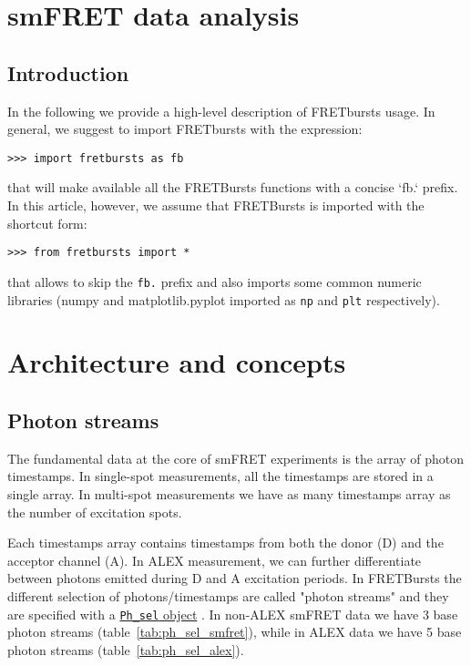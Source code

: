 \section{smFRET data analysis}

\subsection{Introduction}

In the following we provide a high-level description of FRETbursts usage. In general, we suggest to import FRETbursts with the expression:

\begin{verbatim}
>>> import fretbursts as fb
\end{verbatim}

that will make available all the FRETBursts functions with a concise `fb.` prefix. In this article, however, we assume that FRETBursts is imported with the shortcut form:

\begin{verbatim}
>>> from fretbursts import *
\end{verbatim}

that allows to skip the \verb|fb.| prefix and also imports some common numeric libraries (numpy and matplotlib.pyplot imported as \verb|np| and \verb|plt| respectively).

\section{Architecture and concepts}
\subsection{Photon streams}

The fundamental data at the core of smFRET experiments is the array of photon timestamps. In single-spot measurements, all the timestamps are stored in a single array. In multi-spot measurements we have as many timestamps array as the number of excitation spots.

Each timestamps array contains timestamps from both the donor (D) and the acceptor channel (A). In ALEX measurement, we can further differentiate between photons emitted during D and A excitation periods. In FRETBursts the different selection of photons/timestamps are called "photon streams" and they are specified with a \href{http://fretbursts.readthedocs.org/en/latest/data_class.html#module-fretbursts.ph_sel}{\texttt{Ph\_sel} object} . In non-ALEX smFRET data we have 3 base photon streams (table~\ref{tab:ph_sel_smfret}), while in ALEX data we have 5 base photon streams 
(table~\ref{tab:ph_sel_alex}).

